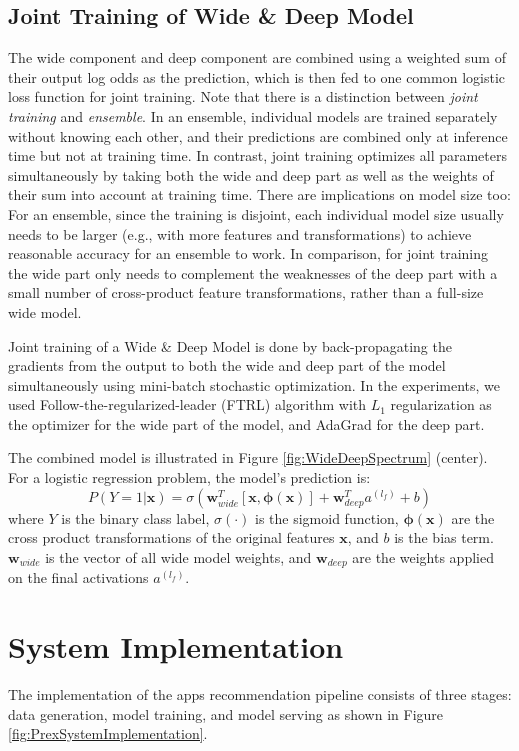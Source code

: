 \documentclass{sig-alternate-05-2015}
\begin{document}
\subsection{Joint Training of Wide \& Deep Model}
The wide component and deep component are combined using a weighted sum of their output log odds as the prediction, which is then fed to one common logistic loss function for joint training.
Note that there is a distinction between \textit{joint training} and \textit{ensemble}.
In an ensemble, individual models are trained separately without knowing each other, and their predictions are combined only at inference time but not at training time.
In contrast, joint training optimizes all parameters simultaneously by taking both the wide and deep part as well as the weights of their sum into account at training time.
There are implications on model size too:
For an ensemble, since the training is disjoint, each individual model size usually needs to be larger (e.g., with more features and transformations) to achieve reasonable accuracy for an ensemble to work.
In comparison, for joint training the wide part only needs to complement the weaknesses of the deep part with a small number of cross-product feature transformations, rather than a full-size wide model.

Joint training of a Wide \& Deep Model is done by back-propagating the gradients from the output to both the wide and deep part of the model simultaneously using mini-batch stochastic optimization. In the experiments, we used Follow-the-regularized-leader (FTRL) algorithm \cite{FTRL11} with $L_1$ regularization as the optimizer for the wide part of the model, and AdaGrad \cite{Adagrad11} for the deep part.

The combined model is illustrated in Figure \ref{fig:WideDeepSpectrum} (center).
For a logistic regression problem, the model's prediction is:
\begin{equation}
P(Y=1|\mathbf{x}) = \sigma(\mathbf{w}_{wide}^T[\mathbf{x}, \mathbf{\phi(x)}] + \mathbf{w}_{deep}^T a^{(l_f)} + b)
\end{equation}
where $Y$ is the binary class label, $\sigma(\cdot)$ is the sigmoid function, $\mathbf{\phi(x)}$ are the cross product transformations of the original features $\mathbf{x}$, and $b$ is the bias term. $\mathbf{w}_{wide}$ is the vector of all wide model weights, and $\mathbf{w}_{deep}$ are the weights applied on the final activations $a^{(l_f)}$.

\section{System Implementation}
The implementation of the apps recommendation pipeline consists of three stages: data generation, model training, and model serving as shown in Figure \ref{fig:PrexSystemImplementation}.
\end{document}
